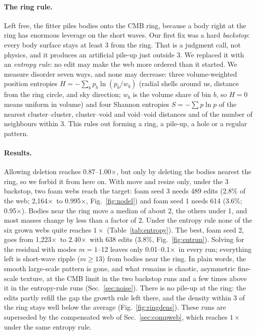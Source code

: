 \documentclass[aps,prd,twocolumn,nofootinbib,superscriptaddress,floatfix]{revtex4-2}
\newcommand{\fl}{\ensuremath{\times}}
\begin{document}
\paragraph*{The ring rule.} Left free, the fitter piles bodies onto the CMB ring, because a body right at the ring has enormous leverage on the short waves. Our first fix was a hard \emph{backstop}: every body surface stays at least \SI{3}{\Gpc} from the ring. That is a judgment call, not physics, and it produces an artificial pile-up just outside \SI{3}{\Gpc}. We replaced it with an \emph{entropy rule}: no edit may make the web more ordered than it started. We measure disorder seven ways, and none may decrease: three volume-weighted position entropies $H=-\sum_b p_b\ln(p_b/w_b)$ (radial shells around us, distance from the ring circle, and sky direction; $w_b$ is the volume share of bin $b$, so $H=0$ means uniform in volume) and four Shannon entropies $S=-\sum p\ln p$ of the nearest cluster--cluster, cluster--void and void--void distances and of the number of neighbours within \SI{3}{\Gpc}. This rules out forming a ring, a pile-up, a hole or a regular pattern.

\paragraph*{Results.} Allowing deletion reaches 0.87--1.00\fl, but only by deleting the bodies nearest the ring, so we forbid it from here on. With move and resize only, under the \SI{3}{\Gpc} backstop, two foam webs reach the target: foam seed 3 needs 489 edits (2.8\% of the web; 2,164\fl\ to 0.995\fl, Fig.~\ref{fig:nodel}) and foam seed 1 needs 614 (3.6\%; 0.95\fl). Bodies near the ring move a median of about \SI{2}{\Gpc}, the others under \SI{1}{\Gpc}, and most masses change by less than a factor of 2. Under the entropy rule none of the six grown webs quite reaches $1\times$ (Table~\ref{tab:entropy}). The best, foam seed 2, goes from 1,223\fl\ to 2.40\fl\ with 638 edits (3.8\%, Fig.~\ref{fig:entrun}). Solving for the residual with modes $m=1$--12 leaves only 0.01--0.1\fl\ in every run; everything left is short-wave ripple ($m\geq13$) from bodies near the ring. In plain words, the smooth large-scale pattern is gone, and what remains is chaotic, asymmetric fine-scale texture, at the CMB limit in the two backstop runs and a few times above it in the entropy-rule runs (Sec.~\ref{sec:noise}). There is no pile-up at the ring: the edits partly refill the gap the growth rule left there, and the density within \SI{3}{\Gpc} of the ring stays well below the average (Fig.~\ref{fig:ringdens}). These runs are superseded by the compensated web of Sec.~\ref{sec:compweb}, which reaches $1\times$ under the same entropy rule.
\end{document}
